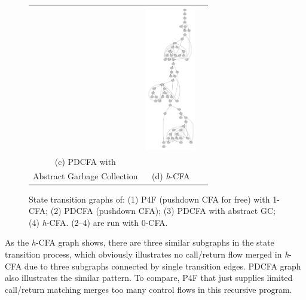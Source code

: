 \documentclass[12pt]{report}
\begin{document}
\begin{figure}
\begin{center}
\begin{tabular}{ccc}
&
\includegraphics[height=2.5in]{hcfa.pdf}
\\
(c) PDCFA with \\Abstract Garbage Collection
&
(d) \textit{h}-CFA
\end{tabular}
\end{center}
\caption[State transition graphs]{
State transition graphs of: (1) P4F (pushdown CFA for free) with 1-CFA\@;
(2) PDCFA (pushdown CFA); (3) PDCFA with abstract GC\@; (4) \textit{h}-CFA\@.
(2--4) are run with 0-CFA\@.
}
\label{fig:state-graphs}
\end{figure}
As the \textit{h}-CFA graph shows, there are three similar subgraphs in the state transition process, which obviously illustrates
no call/return flow merged in \textit{h}-CFA due to three subgraphs connected by single transition edges.
PDCFA graph also illustrates the similar pattern.
To compare, P4F that just supplies limited call/return matching merges too many control flows in this recursive program.

\end{document}
